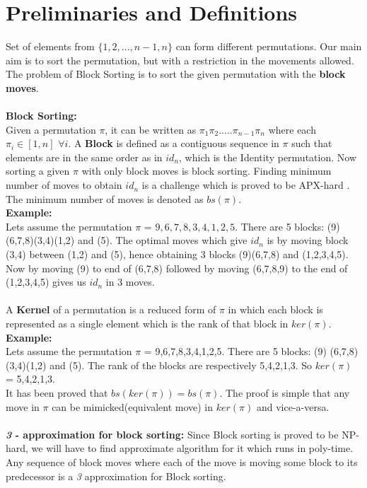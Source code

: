 \documentclass[BTech]{iitmdiss}
\begin{document}
\section{Preliminaries and Definitions}
Set of elements from $\{1,2,...,n-1,n\}$ can form different permutations. Our main aim is to sort the permutation, but with a restriction in the movements allowed. The problem of Block Sorting is to sort the given permutation with the \textbf{block moves}.\\~\\
\textbf{Block Sorting:}\\
Given a permutation $\pi$, it can be written as $\pi_1\pi_2.....\pi_{n-1}\pi_{n}$ where each $\pi_i \in [1,n]$ $\forall i$. A \textbf{Block} is defined as a contiguous sequence in $\pi$ such that elements are in the same order as in $id_n$, which is the Identity permutation. Now sorting a given $\pi$ with only block moves is block sorting. Finding minimum number of moves to obtain $id_n$ is a challenge which is proved to be APX-hard \citep{narayanaswamy2015block}. The minimum number of moves is denoted as $bs(\pi)$.\\
\textbf{Example:}\\
Lets assume the permutation $\pi$ = $9,6,7,8,3,4,1,2,5.$ There are 5 blocks: (9) 	(6,7,8)(3,4)(1,2) and (5). The optimal moves which give $id_n$ is by moving block (3,4) between (1,2) and (5), hence obtaining 3 blocks (9)(6,7,8) and (1,2,3,4,5). Now by moving (9) to end of (6,7,8) followed by moving (6,7,8,9) to the end of (1,2,3,4,5) gives us $id_n$ in 3 moves.\\~\\
\noindent
A \textbf{Kernel} of a permutation is a reduced form of $\pi$ in which each block is represented as a single element which is the rank of that block in $ker(\pi)$.\\
\textbf{Example:}\\
Lets assume the permutation $\pi$ = 9,6,7,8,3,4,1,2,5. There are 5 blocks: (9)
(6,7,8)(3,4)(1,2) and (5). The rank of the blocks are respectively 5,4,2,1,3. So $ker(\pi)$ = 5,4,2,1,3.\\
It has been proved that $bs(ker(\pi)) = bs(\pi)$. The proof is simple that any move in $\pi$ can be mimicked(equivalent move) in $ker(\pi)$ and vice-a-versa.\\~\\
\noindent
\textbf{\textit{3} - approximation for block sorting:} 
Since Block sorting is proved to be NP-hard, we will have to find approximate algorithm for it which runs in poly-time. Any sequence of block moves where each of the move is moving some block to its predecessor is a \textit{3} approximation for Block sorting.\\
\end{document}
